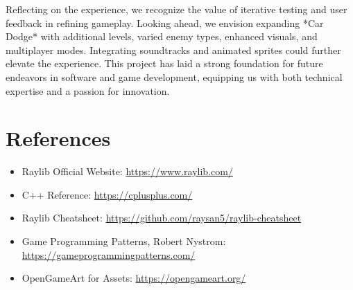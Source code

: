 \documentclass[12pt,a4paper]{article}
\begin{document}
Reflecting on the experience, we recognize the value of iterative testing and user feedback in refining gameplay. Looking ahead, we envision expanding *Car Dodge* with additional levels, varied enemy types, enhanced visuals, and multiplayer modes. Integrating soundtracks and animated sprites could further elevate the experience. This project has laid a strong foundation for future endeavors in software and game development, equipping us with both technical expertise and a passion for innovation. \\

\section{References}

\begin{itemize}
    \item Raylib Official Website: \url{https://www.raylib.com/}
    \item C++ Reference: \url{https://cplusplus.com/}
    \item Raylib Cheatsheet: \url{https://github.com/raysan5/raylib-cheatsheet}
    \item Game Programming Patterns, Robert Nystrom: \url{https://gameprogrammingpatterns.com/}
    \item OpenGameArt for Assets: \url{https://opengameart.org/}
\end{itemize}
\end{document}
